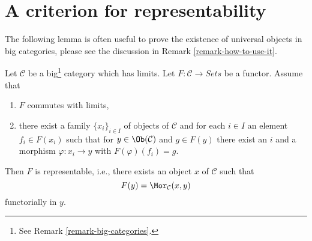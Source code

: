 \section{A criterion for representability}
\label{section-representable}

\noindent
The following lemma is often useful to prove the existence of
universal objects in big categories, please see the discussion
in Remark \ref{remark-how-to-use-it}.

\begin{lemma}
\label{lemma-a-version-of-brown}
Let $\mathcal{C}$ be a big\footnote{See Remark \ref{remark-big-categories}.}
category which has limits. Let $F : \mathcal{C} \to \textit{Sets}$ be a
functor. Assume that
\begin{enumerate}
\item $F$ commutes with limits,
\item there exist a family $\{x_i\}_{i \in I}$ of objects of $\mathcal{C}$
and for each $i \in I$ an element $f_i \in F(x_i)$
such that for $y \in \Ob(\mathcal{C})$ and $g \in F(y)$
there exist an $i$ and a morphism $\varphi : x_i \to y$
with $F(\varphi)(f_i) = g$.
\end{enumerate}
Then $F$ is representable, i.e., there exists an object $x$
of $\mathcal{C}$ such that
$$
F(y) = \Mor_\mathcal{C}(x, y)
$$
functorially in $y$.
\end{lemma}

